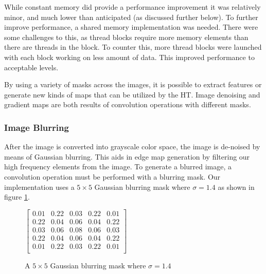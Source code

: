 \documentclass[12pt]{article}
\begin{document}
While constant memory did provide a performance improvement it was relatively minor, and much lower than anticipated (as discussed further below).
To further improve performance,  a shared memory implementation was needed.
There were some challenges to this, as thread blocks require more memory elements than there are threads in the block.
To counter this, more thread blocks were launched with each block working on less amount of data.
This improved performance to acceptable levels.

By using a variety of masks across the images, it is possible to extract features or generate new kinds of maps that can be utilized by the HT\@.
Image denoising and gradient maps are both results of convolution operations with different masks.

\subsubsection*{Image Blurring}
\noindent
After the image is converted into grayscale color space, the image is de-noised by means of Gaussian blurring.
This aids in edge map generation by filtering our high frequency elements from the image.
To generate a blurred image, a convolution operation must be performed with a blurring mask. 
Our implementation uses a $5 \times 5$ Gaussian blurring mask where $\sigma = 1.4$ as shown in figure \ref{equation:gaussian5by5}.

\begin{figure} %
  \centering
  $\begin{bmatrix}
  0.01 & 0.22 & 0.03 & 0.22 & 0.01 \\
  0.22 & 0.04 & 0.06 & 0.04 & 0.22 \\
  0.03 & 0.06 & 0.08 & 0.06 & 0.03 \\
  0.22 & 0.04 & 0.06 & 0.04 & 0.22 \\
  0.01 & 0.22 & 0.03 & 0.22 & 0.01 \\
\end{bmatrix}$\caption{A $5 \times 5$ Gaussian blurring mask where $\sigma = 1.4$}\label{equation:gaussian5by5}
\end{figure}
\end{document}
